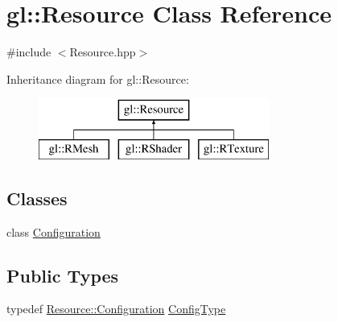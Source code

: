 \hypertarget{classgl_1_1_resource}{\section{gl\-:\-:Resource Class Reference}
\label{classgl_1_1_resource}
}


{\ttfamily \#include $<$Resource.\-hpp$>$}

Inheritance diagram for gl\-:\-:Resource\-:\begin{figure}[H]
\begin{center}
\leavevmode
\includegraphics[height=2.000000cm]{classgl_1_1_resource}
\end{center}
\end{figure}
\subsection*{Classes}
\begin{DoxyCompactItemize}
\item 
class \hyperlink{classgl_1_1_resource_1_1_configuration}{Configuration}
\end{DoxyCompactItemize}
\subsection*{Public Types}
\begin{DoxyCompactItemize}
\item 
typedef \hyperlink{classgl_1_1_resource_1_1_configuration}{Resource\-::\-Configuration} \hyperlink{classgl_1_1_resource_a18683d13ef2edfbe9cb1e694497f6898}{Config\-Type}
\end{DoxyCompactItemize}
